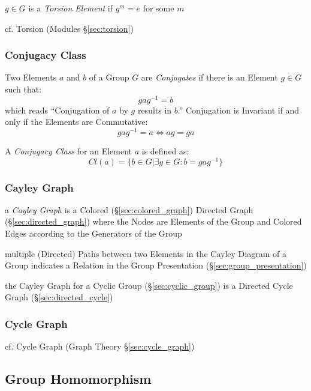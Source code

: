 $g \in G$ is a \emph{Torsion Element} if $g^m = e$ for some $m$

cf. Torsion (Modules \S\ref{sec:torsion})



\subsubsection{Conjugacy Class}\label{sec:conjugacy_class}

Two Elements $a$ and $b$ of a Group $G$ are \emph{Conjugates} if there is an
Element $g \in G$ such that:
\[
    gag^{-1} = b
\]
which reads ``Conjugation of $a$ by $g$ results in $b$.'' Conjugation is
Invariant if and only if the Elements are Commutative:
\[
    gag^{-1} = a \Leftrightarrow ag = ga
\]

A \emph{Conjugacy Class} for an Element $a$ is defined as:
\[
    Cl(a) = \{ b \in G | \exists g \in G : b = gag^{-1}\}
\]



\subsubsection{Cayley Graph}\label{sec:cayley_graph}

a \emph{Cayley Graph} is a Colored (\S\ref{sec:colored_graph}) Directed Graph
(\S\ref{sec:directed_graph}) where the Nodes are Elements of the Group and
Colored Edges according to the Generators of the Group

multiple (Directed) Paths between two Elements in the Cayley Diagram of a Group
indicates a Relation in the Group Presentation (\S\ref{sec:group_presentation})

the Cayley Graph for a Cyclic Group (\S\ref{sec:cyclic_group}) is a Directed
Cycle Graph (\S\ref{sec:directed_cycle})



\subsubsection{Cycle Graph}\label{sec:group_cycle_graph}

cf. Cycle Graph (Graph Theory \S\ref{sec:cycle_graph})



\subsection{Group Homomorphism}\label{sec:group_homomorphism}

